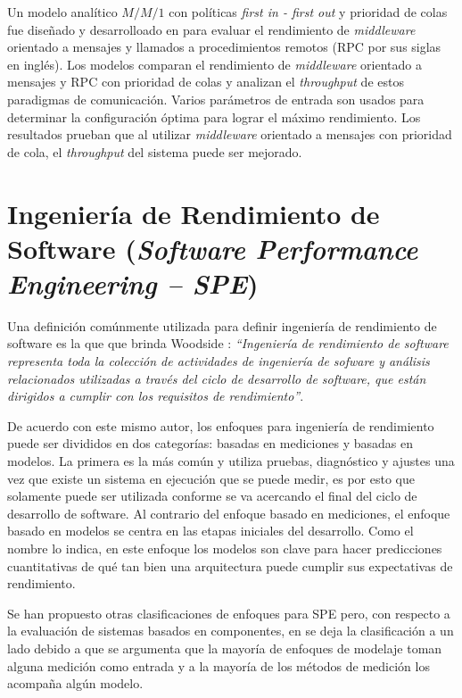 \documentclass[conference]{IEEEtran}
\begin{document}
Un modelo analítico $M/M/1$ con políticas \emph{first in - first out} y prioridad de colas fue diseñado y desarrolloado en \cite{alwakeel} para evaluar el rendimiento de \emph{middleware} orientado a mensajes y llamados a procedimientos remotos (RPC por sus siglas en inglés). Los modelos comparan el rendimiento de \emph{middleware} orientado a mensajes y RPC con prioridad de colas y analizan el \emph{throughput} de estos paradigmas de comunicación. Varios parámetros de entrada son usados para determinar la configuración óptima para lograr el máximo rendimiento. Los resultados prueban que al utilizar \emph{middleware} orientado a mensajes con prioridad de cola, el \emph{throughput} del sistema puede ser mejorado. 

\section{Ingeniería de Rendimiento de Software (\emph{Software Performance Engineering -- SPE})} \label{sec:spe}
Una definición comúnmente utilizada para definir ingeniería de rendimiento de software es la que que brinda Woodside \cite{woodside-et-al}: \emph{``Ingeniería de rendimiento de software representa toda la colección de actividades de ingeniería de sofware y análisis relacionados utilizadas a través del ciclo de desarrollo de software, que están dirigidos a cumplir con los requisitos de rendimiento''}. 

De acuerdo con este mismo autor, los enfoques para ingeniería de rendimiento puede ser divididos en dos categorías: basadas en mediciones y basadas en modelos. La primera es la más común y utiliza pruebas, diagnóstico y ajustes una vez que existe un sistema en ejecución que se puede medir, es por esto que solamente puede ser utilizada conforme se va acercando el final del ciclo de desarrollo de software. Al contrario del enfoque basado en mediciones, el enfoque basado en modelos se centra en las etapas iniciales del desarrollo. Como el nombre lo indica, en este enfoque los modelos son clave para hacer predicciones cuantitativas de qué tan bien una arquitectura puede cumplir sus expectativas de rendimiento.

Se han propuesto otras clasificaciones de enfoques para SPE pero, con respecto a la evaluación de sistemas basados en componentes, en \cite{performance-model-survey} se deja la clasificación a un lado debido a que se argumenta que la mayoría de enfoques de modelaje toman alguna medición como entrada y a la mayoría de los métodos de medición los acompaña algún modelo.
\end{document}
